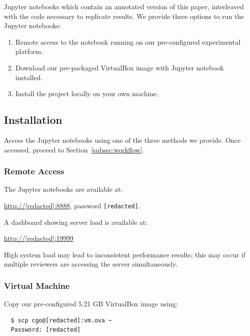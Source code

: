 Jupyter notebooks which contain an annotated version of this paper, interleaved with the code necessary to replicate results. We provide three options to run the Jupyter notebooks:
\begin{enumerate}
\item Remote access to the notebook running on our pre-configured experimental platform.
\item Download our pre-packaged VirtualBox image with Jupyter notebook installed.
\item Install the project locally on your own machine.
\end{enumerate}

\subsection{Installation}\label{subsec:installation}

Access the Jupyter notebooks using one of the three methods we provide. Once accessed, proceed to Section~\ref{subsec:workflow}.

\subsubsection{Remote Access}

The Jupyter notebooks are available at:

\url{http://[redacted]:8888}, password \texttt{[redacted]}.

\vspace{1em}
\noindent
A dashboard showing server load is available at:

\url{http://[redacted]:19999}

\vspace{1em}
\noindent
High system load may lead to inconsistent performance results; this may occur if multiple reviewers are accessing the server simultaneously.

\newpage
\subsubsection{Virtual Machine}

Copy our pre-configured 5.21 GB VirtualBox image using:
\begin{verbatim}
  $ scp cgo@[redacted]:vm.ova ~
  Password: [redacted]
\end{verbatim}

